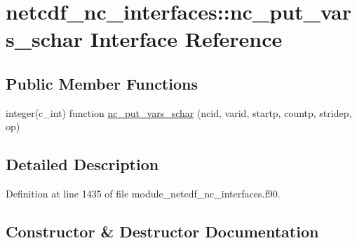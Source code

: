 \hypertarget{interfacenetcdf__nc__interfaces_1_1nc__put__vars__schar}{}\section{netcdf\+\_\+nc\+\_\+interfaces\+:\+:nc\+\_\+put\+\_\+vars\+\_\+schar Interface Reference}
\label{interfacenetcdf__nc__interfaces_1_1nc__put__vars__schar}
\subsection*{Public Member Functions}
\begin{DoxyCompactItemize}
\item 
integer(c\+\_\+int) function \hyperlink{interfacenetcdf__nc__interfaces_1_1nc__put__vars__schar_ab90159cf23b0e33c9b5449654ed67cca}{nc\+\_\+put\+\_\+vars\+\_\+schar} (ncid, varid, startp, countp, stridep, op)
\end{DoxyCompactItemize}


\subsection{Detailed Description}


Definition at line 1435 of file module\+\_\+netcdf\+\_\+nc\+\_\+interfaces.\+f90.



\subsection{Constructor \& Destructor Documentation}
\mbox{\label{interfacenetcdf__nc__interfaces_1_1nc__put__vars__schar_ab90159cf23b0e33c9b5449654ed67cca}} 
